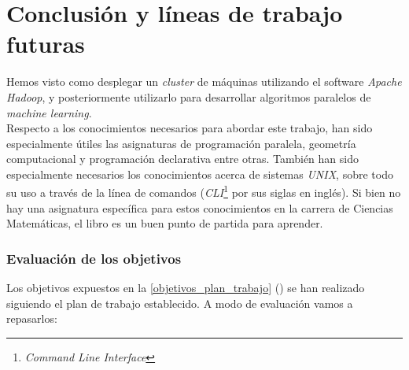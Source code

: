\chapter*{Conclusión y líneas de trabajo futuras}
Hemos visto como desplegar un \textit{cluster} de máquinas utilizando el software  \textit{Apache Hadoop}, 
y posteriormente utilizarlo para desarrollar algoritmos paralelos de \textit{machine learning}.\\
Respecto a los conocimientos necesarios para abordar este trabajo, han sido especialmente útiles las asignaturas
de programación paralela, geometría computacional y programación declarativa entre otras. También han sido especialmente
necesarios los conocimientos acerca de sistemas \textit{UNIX}, sobre todo su uso a través de la línea de comandos
(\textit{CLI}\footnote{\textit{Command Line Interface}} por sus siglas en inglés). Si bien no hay una asignatura
específica para estos conocimientos en la carrera de Ciencias Matemáticas, el libro \cite{unix_programming_environment}
es un buen punto de partida para aprender.

\subsection*{Evaluación de los objetivos}
Los objetivos expuestos en la \autoref{objetivos_plan_trabajo} () 
se han realizado siguiendo el plan de trabajo establecido. A modo de evaluación vamos a repasarlos:

